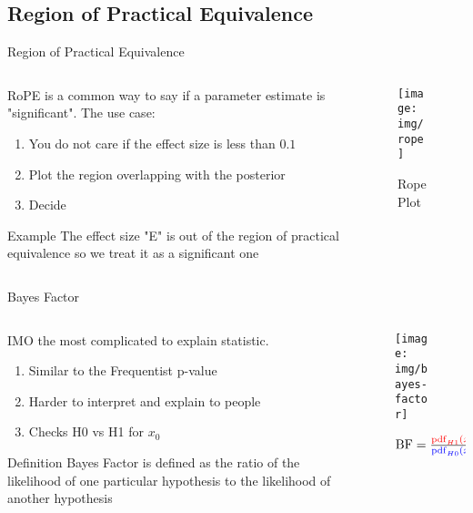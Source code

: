 \documentclass{beamer}
\begin{document}
\subsection{Region of Practical Equivalence}
\begin{frame}{Region of Practical Equivalence}
\begin{columns}
\begin{column}{0.5\linewidth}
RoPE is a common way to say if a parameter estimate is "significant". The use case:
\begin{enumerate}
    \item You do not care if the effect size is less than $0.1$
    \item Plot the region overlapping with the posterior
    \item Decide
\end{enumerate}
\begin{block}{Example}
    The effect size "E" is out of the region of practical equivalence so we treat it as a significant one
\end{block}
\end{column}
\begin{column}{0.5\linewidth}
\begin{figure}
    \centering
    \texttt{[image: img/rope]}
    \caption{Rope Plot}
\end{figure}
\end{column}
\end{columns}
\end{frame}
\begin{frame}{Bayes Factor}
\begin{columns}
    \begin{column}{0.5\linewidth}
    IMO the most complicated to explain statistic.
    \begin{enumerate}
        \item Similar to the Frequentist p-value
        \item Harder to interpret and explain to people
        \item Checks H0 vs H1 for $x_0$
    \end{enumerate}
    \begin{block}{Definition}
        Bayes Factor is defined as the ratio of the likelihood of one particular hypothesis to the likelihood of another hypothesis
    \end{block}
    \end{column}
    \begin{column}{0.5\linewidth}
    \begin{figure}
        \centering
        \texttt{[image: img/bayes-factor]}
        \caption{$\text{BF} = \frac{
        \textcolor{red}{\operatorname{pdf}_{H1}(x_0)}
        }{
        \textcolor{blue}{\operatorname{pdf}_{H0}(x_0)}
        }$}
        \label{fig:my_label}
    \end{figure}
    \end{column}
\end{columns}
\end{frame}
\end{document}
